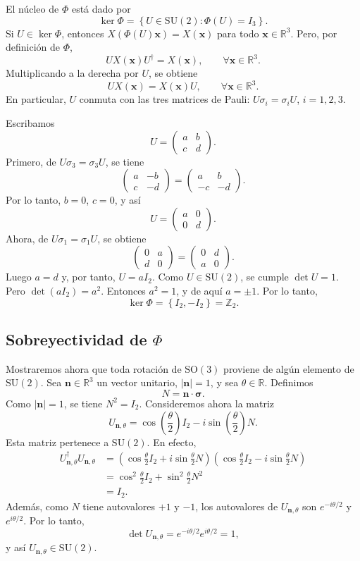 \documentclass[11pt,a4paper]{article}
\newcommand{\R}{\mathbb{R}}
\newcommand{\SU}{\mathrm{SU}}
\newcommand{\SO}{\mathrm{SO}}
\newcommand{\kerp}{\operatorname{ker}}
\newcommand{\vect}[1]{\boldsymbol{#1}}
\newcommand{\set}[1]{\left\{#1\right\}}
\begin{document}
El núcleo de $\Phi$ está dado por
\[
\kerp\Phi=\set{U\in\SU(2):\Phi(U)=I_3}.
\]
Si $U\in\kerp\Phi$, entonces $X(\Phi(U)\vect x)=X(\vect x)$ para todo $\vect x\in\R^3$. Pero, por definición de $\Phi$,
\[
UX(\vect x)U^\dagger=X(\vect x),\qquad \forall\vect x\in\R^3.
\]
Multiplicando a la derecha por $U$, se obtiene
\[
UX(\vect x)=X(\vect x)U,\qquad \forall\vect x\in\R^3.
\]
En particular, $U$ conmuta con las tres matrices de Pauli: $U\sigma_i=\sigma_iU$, $i=1,2,3$.

Escribamos
\[
U=\begin{pmatrix}a&b\\c&d\end{pmatrix}.
\]
Primero, de $U\sigma_3=\sigma_3U$, se tiene
\[
\begin{pmatrix}a&-b\\c&-d\end{pmatrix}
=\begin{pmatrix}a&b\\-c&-d\end{pmatrix}.
\]
Por lo tanto, $b=0$, $c=0$, y así
\[
U=\begin{pmatrix}a&0\\0&d\end{pmatrix}.
\]
Ahora, de $U\sigma_1=\sigma_1U$, se obtiene
\[
\begin{pmatrix}0&a\\d&0\end{pmatrix}
=\begin{pmatrix}0&d\\a&0\end{pmatrix}.
\]
Luego $a=d$ y, por tanto, $U=aI_2$. Como $U\in\SU(2)$, se cumple $\det U=1$. Pero $\det(aI_2)=a^2$. Entonces $a^2=1$, y de aquí $a=\pm1$. Por lo tanto,
\[
\kerp\Phi=\set{I_2,-I_2}=\mathbb{Z}_2.
\]

\subsection*{Sobreyectividad de $\Phi$}

Mostraremos ahora que toda rotación de $\SO(3)$ proviene de algún elemento de $\SU(2)$. Sea $\vect n\in\R^3$ un vector unitario, $|\vect n|=1$, y sea $\theta\in\R$. Definimos
\[
N=\vect n\cdot\vect\sigma.
\]
Como $|\vect n|=1$, se tiene $N^2=I_2$. Consideremos ahora la matriz
\[
U_{\vect n,\theta}=\cos\left(\frac{\theta}{2}\right)I_2-i\sin\left(\frac{\theta}{2}\right)N.
\]
Esta matriz pertenece a $\SU(2)$. En efecto,
\begin{align*}
U_{\vect n,\theta}^\dagger U_{\vect n,\theta}
&=\left(\cos\frac{\theta}{2}I_2+i\sin\frac{\theta}{2}N\right)
  \left(\cos\frac{\theta}{2}I_2-i\sin\frac{\theta}{2}N\right)\\
&=\cos^2\frac{\theta}{2}I_2+\sin^2\frac{\theta}{2}N^2\\
&=I_2.
\end{align*}
Además, como $N$ tiene autovalores $+1$ y $-1$, los autovalores de $U_{\vect n,\theta}$ son $e^{-i\theta/2}$ y $e^{i\theta/2}$. Por lo tanto,
\[
\det U_{\vect n,\theta}=e^{-i\theta/2}e^{i\theta/2}=1,
\]
y así $U_{\vect n,\theta}\in\SU(2)$.
\end{document}
